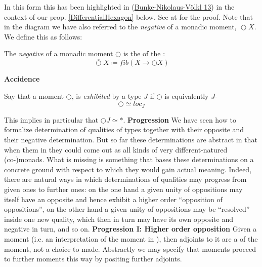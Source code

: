 In this form this has been highlighted in (\hyperlink{BunkeNikolausVoelkl13}{Bunke-Nikolaus-Völkl 13}) in the context of our prop. \ref{DifferentialHexagon} below. See at  for the proof.
Note that in the diagram we have also referred to the \emph{negative} of a monadic moment, $\overline{\bigcirc} X$. We define this as follows:
\begin{defn}
\label{NegativeMonadicMoment}\hypertarget{NegativeMonadicMoment}{}
The \emph{negative} of a monadic moment $\bigcirc$ is the  of the :
\begin{displaymath}
\overline{\bigcirc} X \coloneqq fib(X \to \bigcirc X)
\end{displaymath}
\end{defn}
\textbf{Accidence}
\begin{defn}
\label{Localization}\hypertarget{Localization}{}
Say that a moment $\bigcirc$, is \emph{exhibited} by a type $J$ if $\bigcirc$ is equivalently $J$-
\begin{displaymath}
\bigcirc \simeq loc_{J}
\end{displaymath}
\end{defn}
This implies in particular that $\bigcirc J \simeq \ast$.
\textbf{Progression}
We have seen how to formalize determination of qualities of types together with their opposite and their negative determination. But so far these determinations are abstract in that when  them in  they could come out as all kinds of very different-natured (co-)monads. What is missing is something that bases these determinations on a concrete ground with respect to which they would gain actual meaning.
Indeed, there are natural ways in which determinations of qualities may progress from given ones to further ones: on the one hand a given unity of oppositions may itself have an opposite and hence exhibit a higher order ``opposition of oppositions'', on the other hand a given unity of oppositions may be ``resolved'' inside one new quality, which then in turn may have its own opposite and negative in turn, and so on.
\textbf{Progression I: Higher order opposition}
Given a  moment (i.e. an interpretation of the moment in ), then adjoints to it are a  of the moment, not a choice to made. Abstractly we may specify that moments proceed to further moments this way by positing further adjoints.
